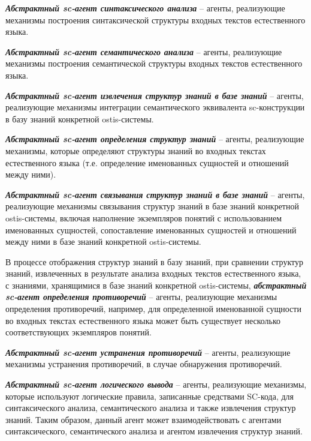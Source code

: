 \textit{\textbf{Абстрактный sc-агент синтаксического анализа}} -- агенты, реализующие механизмы построения синтаксической структуры входных текстов естественного языка.

\textit{\textbf{Абстрактный sc-агент семантического анализа}} -- агенты, реализующие механизмы построения семантической структуры входных текстов естественного языка.

\textit{\textbf{Абстрактный sc-агент извлечения структур знаний в базе знаний}} -- агенты, реализующие механизмы интеграции семантического эквивалента sc-конструкции в базу знаний конкретной ostis-системы.

\textit{\textbf{Абстрактный sc-агент определения структур знаний}} -- агенты, реализующие механизмы, которые определяют структуры знаний во входных текстах естественного языка (т.е. определение именованных сущностей и отношений между ними).

\textit{\textbf{Абстрактный sc-агент связывания структур знаний в базе знаний}} -- агенты, реализующие механизмы связывания структур знаний в базе знаний конкретной ostis-системы, включая наполнение экземпляров понятий с использованием именованных сущностей, сопоставление именованных сущностей и отношений между ними в базе знаний конкретной ostis-системы.

В процессе отображения структур знаний в базу знаний, при сравнении структур знаний, извлеченных в результате анализа входных текстов естественного языка, с знаниями, хранящимися в базе знаний конкретной ostis-системы, \textit{\textbf{абстрактный sc-агент определения противоречий}} -- агенты, реализующие механизмы определения противоречий, например, для определенной именованной сущности во входных текстах естественного языка может быть существует несколько соответствующих экземпляров понятий. 

\textit{\textbf{Абстрактный sc-агент устранения противоречий}} -- агенты, реализующие механизмы устранения противоречий, в случае обнаружения противоречий. 

\textit{\textbf{Абстрактный sc-агент логического вывода}} -- агенты, реализующие механизмы, которые используют логические правила, записанные средствами SC-кода, для синтаксического анализа, семантического анализа и также извлечения структур знаний. Таким образом, данный агент может взаимодействовать с агентами синтаксического, семантического анализа и агентом извлечения структур знаний.

